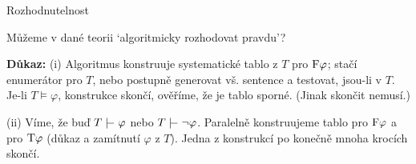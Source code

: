 \documentclass{beamer}
\begin{document}
\begin{frame}{Rozhodnutelnost}

    \pause
    \vspace{-3pt}
    Můžeme v dané teorii \alert{`algoritmicky rozhodovat pravdu'}?

    \pause
    \vspace{-3pt}

    
    \pause
    
    \pause
    \textbf{Důkaz:} \pause \alert{(i)} \pause Algoritmus konstruuje systematické tablo z $T$ pro $\mathrm{F}\varphi$; stačí enumerátor pro $T$, nebo postupně generovat vš. sentence a testovat, jsou-li v $T$. Je-li $T\models\varphi$, konstrukce skončí, ověříme, že je tablo sporné. (Jinak skončit nemusí.)
    
    \vspace{-3pt}  
    \pause \alert{(ii)} \pause
    Víme, že buď $T\proves\varphi$ nebo $T\proves\neg\varphi$. Paralelně konstruujeme tablo pro $\mathrm{F}\varphi$ a pro $\mathrm{T}\varphi$ (důkaz a zamítnutí $\varphi$ z $T$). Jedna z konstrukcí po konečně mnoha krocích skončí.
    \hfill\qedsymbol

\end{frame}
\end{document}
